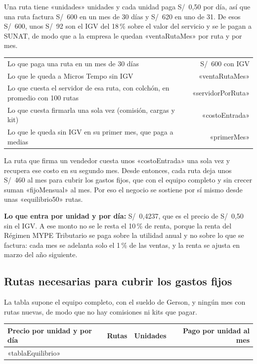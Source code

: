 \documentclass[10.5pt,a4paper]{article}
\begin{document}
Una ruta tiene «unidades» unidades y cada unidad paga S/~0,50 por día, así que una ruta factura S/~600 en un mes de 30 días y S/~620 en uno de 31. De esos S/~600, unos S/~92 son el IGV del 18\,\% sobre el valor del servicio y se le pagan a SUNAT, de modo que a la empresa le quedan «ventaRutaMes» por ruta y por mes.

\begin{center}
\begin{tabularx}{0.86\linewidth}{@{}Xr@{}}
\toprule
Lo que paga una ruta en un mes de 30 días & S/~600 con IGV\\
Lo que le queda a Micros Tempo sin IGV & «ventaRutaMes»\\
Lo que cuesta el servidor de esa ruta, con colchón, en promedio con 100 rutas & «servidorPorRuta»\\
Lo que cuesta firmarla una sola vez (comisión, cargas y kit) & «costoEntrada»\\
Lo que le queda sin IGV en su primer mes, que paga a medias & «primerMes»\\
\bottomrule
\end{tabularx}
\end{center}

La ruta que firma un vendedor cuesta unos «costoEntrada» una sola vez y recupera ese costo en su segundo mes. Desde entonces, cada ruta deja unos S/~460 al mes para cubrir los gastos fijos, que con el equipo completo y sin crecer suman «fijoMensual» al mes. Por eso el negocio se sostiene por sí mismo desde unas «equilibrio50» rutas.

\begin{nota}
\textbf{Lo que entra por unidad y por día:} S/~0,4237, que es el precio de S/~0,50 sin el IGV. A ese monto no se le resta el 10\,\% de renta, porque la renta del Régimen MYPE Tributario se paga sobre la utilidad anual y no sobre lo que se factura: cada mes se adelanta solo el 1\,\% de las ventas, y la renta se ajusta en marzo del año siguiente.
\end{nota}

\subsection{Rutas necesarias para cubrir los gastos fijos}

La tabla supone el equipo completo, con el sueldo de Gerson, y ningún mes con rutas nuevas, de modo que no hay comisiones ni kits que pagar.

\begin{center}
\begin{tabular}{@{}lrrr@{}}
\toprule
Precio por unidad y por día & Rutas & Unidades & Pago por unidad al mes\\
\midrule
«tablaEquilibrio»
\bottomrule
\end{tabular}
\end{center}
\end{document}
